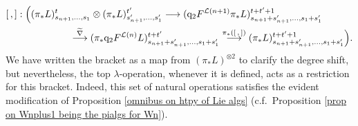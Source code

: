 \documentclass[11pt]{amsart} \renewcommand{\baselinestretch}{1.2}
\theoremstyle{plain}
\numberwithin{equation}{section} %
\theoremstyle{plain}
\numberwithin{equation}{chapter} %
\renewcommand{\to}{\longrightarrow}
\newcommand{\calL}{\mathcal{L}}
\newcommand{\quadgrad}[1]{\mathrm{q}_{#1}}
\begin{document}
\begin{homotopy operations for PRLs}
\begin{alignat*}{2}
[\,,]:\Bigl(&(\pi_*L)_{s_{n+1},\ldots,s_1}^t\otimes (\pi_*L)_{s'_{n+1},\ldots,s'_1}^{t'} 
\overset{}{\to}
(\quadgrad{2}F^{\calL(n+1)}\pi_*L)_{s_{n+1}+s'_{n+1},\ldots,s_1+s'_1}^{t+t'+1}
\\
&\qquad\qquad\overset{\widetilde{\nabla}}{\to}(\pi_*\quadgrad{2}F^{\calL(n)}L)_{s_{n+1}+s'_{n+1},\ldots,s_1+s'_1}^{t+t'} \overset{\pi_*([\,,\,])}{\to}(\pi_*L)_{s_{n+1}+s'_{n+1},\ldots,s_1+s'_1}^{t+t'+1}\Bigr).
\end{alignat*}
We have written the bracket as a map from $(\pi_*L)^{\otimes 2}$ to clarify the degree shift, but nevertheless, the top $\lambda$-operation, whenever it is defined, acts as a restriction for this bracket.
Indeed, this set of natural operations satisfies the evident modification of Proposition \ref{omnibus on htpy of Lie algs} (c.f.\ Proposition \ref{prop on Wnplus1 being the pialgs for Wn}).



\end{homotopy operations for PRLs}
\end{document}
